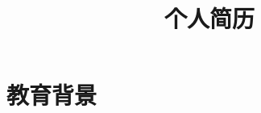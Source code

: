 \documentclass[10pt,a4paper,sans]{moderncv} %
\title{个人简历}
\begin{document}
\makecvtitle %



\section{教育背景}
\end{document}
